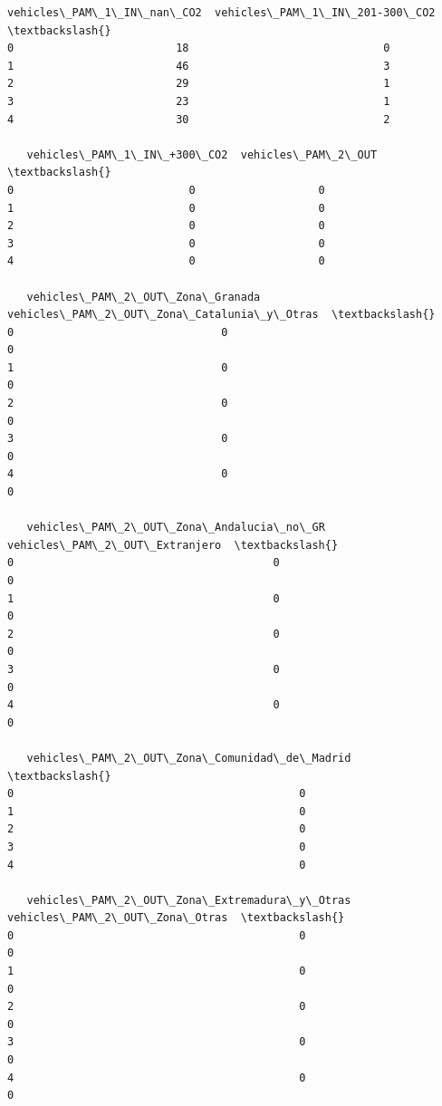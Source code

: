 \documentclass[11pt]{article}
\begin{document}
\begin{tcolorbox}[breakable, size=fbox, boxrule=.5pt, pad at break*=1mm, opacityfill=0]
\begin{Verbatim}[commandchars=\\\{\}]
   vehicles\_PAM\_1\_IN\_nan\_CO2  vehicles\_PAM\_1\_IN\_201-300\_CO2  \textbackslash{}
0                         18                              0
1                         46                              3
2                         29                              1
3                         23                              1
4                         30                              2

   vehicles\_PAM\_1\_IN\_+300\_CO2  vehicles\_PAM\_2\_OUT  \textbackslash{}
0                           0                   0
1                           0                   0
2                           0                   0
3                           0                   0
4                           0                   0

   vehicles\_PAM\_2\_OUT\_Zona\_Granada  vehicles\_PAM\_2\_OUT\_Zona\_Catalunia\_y\_Otras  \textbackslash{}
0                                0                                          0
1                                0                                          0
2                                0                                          0
3                                0                                          0
4                                0                                          0

   vehicles\_PAM\_2\_OUT\_Zona\_Andalucia\_no\_GR  vehicles\_PAM\_2\_OUT\_Extranjero  \textbackslash{}
0                                        0                              0
1                                        0                              0
2                                        0                              0
3                                        0                              0
4                                        0                              0

   vehicles\_PAM\_2\_OUT\_Zona\_Comunidad\_de\_Madrid  \textbackslash{}
0                                            0
1                                            0
2                                            0
3                                            0
4                                            0

   vehicles\_PAM\_2\_OUT\_Zona\_Extremadura\_y\_Otras  vehicles\_PAM\_2\_OUT\_Zona\_Otras  \textbackslash{}
0                                            0                              0
1                                            0                              0
2                                            0                              0
3                                            0                              0
4                                            0                              0


\end{Verbatim}
\end{tcolorbox}
\end{document}
